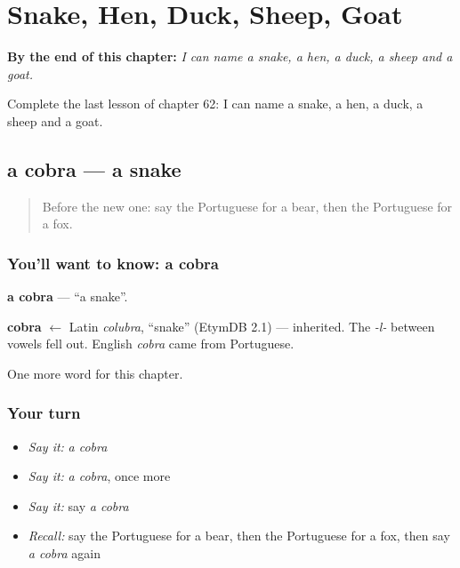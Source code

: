 
\chapter{Snake, Hen, Duck, Sheep, Goat}
\label{ch:pt-snake-hen-duck-sheep-goat}

\begin{chapteropening}
\textbf{By the end of this chapter:} \emph{I can name a snake, a hen, a duck, a sheep and a goat.}

Complete the last lesson of chapter 62: I can name a snake, a hen, a duck, a sheep and a goat.
\end{chapteropening}

\section[a cobra]{a cobra — a snake}

\label{lesson:PT-C62-cobra}



\begin{quote}
Before the new one: say the Portuguese for a bear, then the Portuguese for a fox.
\end{quote}

\subsection*{You'll want to know: a cobra}
\textbf{a cobra} — \textquotedblleft{}a snake\textquotedblright{}.

\begin{cousinweb}
\textbf{cobra} $\leftarrow$ Latin \emph{colubra}, \textquotedblleft{}snake\textquotedblright{} (EtymDB 2.1) — inherited. The \emph{-l-} between vowels fell out. English \emph{cobra} came from Portuguese.
\end{cousinweb}

\begin{grammarlens}[title={What you've built}]
One more word for this chapter.
\end{grammarlens}

\subsection*{Your turn}
\begin{itemize}
\raggedright
  \item \emph{Say it:} \emph{a cobra}
  \item \emph{Say it:} \emph{a cobra}, once more
  \item \emph{Say it:} say \emph{a cobra}
  \item \emph{Recall:} say the Portuguese for a bear, then the Portuguese for a fox, then say \emph{a cobra} again
\end{itemize}

